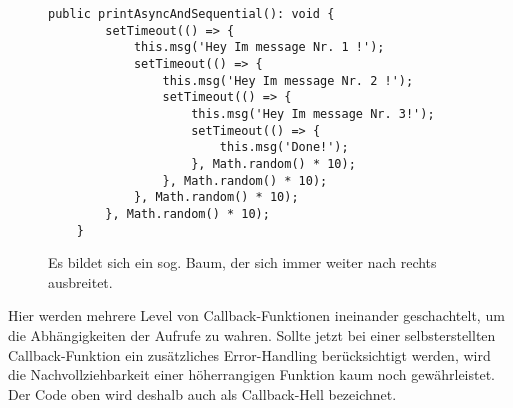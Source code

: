 \begin{figure}[H]
\begin{lstlisting}[basicstyle=\small]
    public printAsyncAndSequential(): void {
        setTimeout(() => {
            this.msg('Hey Im message Nr. 1 !');
            setTimeout(() => {
                this.msg('Hey Im message Nr. 2 !');
                setTimeout(() => {
                    this.msg('Hey Im message Nr. 3!');
                    setTimeout(() => {
                        this.msg('Done!');
                    }, Math.random() * 10);
                }, Math.random() * 10);
            }, Math.random() * 10);
        }, Math.random() * 10);
    }
\end{lstlisting}
\caption{Es bildet sich ein sog. Baum, der sich immer weiter nach rechts ausbreitet.}
\end{figure}

\noindent
Hier werden mehrere Level von Callback-Funktionen ineinander geschachtelt, um die Abhängigkeiten der Aufrufe zu wahren. Sollte jetzt bei einer selbsterstellten Callback-Funktion ein zusätzliches Error-Handling berücksichtigt werden, wird die Nachvollziehbarkeit einer höherrangigen Funktion kaum noch gewährleistet. Der Code oben wird deshalb auch als Callback-Hell bezeichnet.




